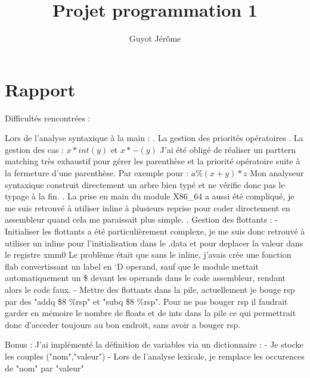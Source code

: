 \documentclass{article}
\title{Projet programmation 1}
\author{Guyot Jérôme}
\begin{document}
\maketitle

\newcommand\tab[1][1cm]{\hspace*{#1}}

\section*{Rapport}

    Difficultés rencontrées :\newline
    
    Lors de l'analyse syntaxique à la main : \newline 
        \tab. La gestion des priorités opératoires \newline
        \tab. La gestion des cas : $x*int(y)$ et $x*-(y)$ \newline
        \tab J'ai été obligé de réaliser un parttern matching très exhaustif pour gérer les parenthèse et la priorité opératoire suite à la fermeture d'une parenthèse. Par exemple pour : $a \% (x + y) * z$       \newline
        \tab Mon analyseur syntaxique construit directement un arbre bien typé et ne vérifie donc pas le typage à la fin. 
        \newline
        \newline
        \tab. La prise en main du module X86\_64 a aussi été compliqué, je me suis retrouvé à utiliser inline à plusieurs reprise pour coder directement en assembleur quand cela me paraissait plus simple. \newline
        \newline
        \tab. Gestion des flottants :\newline
        \tab \tab - Initialiser les flottants a été particulièrement complexe, je me suis donc retrouvé à utiliser un inline pour l'initialisation dans le .data et pour deplacer la valeur dans le registre xmm0
        Le problème était que sans le inline, j'avais crée une fonction flab convertissant un label en `D operand, sauf que le module mettait automatiquement un \$ devant les operands dans le code assembleur, rendant alors le code faux.\newline
        \tab \tab - Mettre des flottants dans la pile, actuellement je bouge rsp par des "addq \$8 \%rsp" et "subq \$8 \%rsp". Pour ne pas bouger rsp il faudrait garder en mémoire le nombre de floats et de ints dans la pile ce qui permettrait donc d'acceder toujours au bon endroit, sans avoir a bouger rsp.\newline

    Bonus : \newline
        \tab J'ai implémenté la définition de variables via un dictionnaire : \newline
        \tab \tab - Je stocke les couples ("nom","valeur") \newline
        \tab \tab - Lors de l'analyse lexicale, je remplace les occurences de "nom" par "valeur" \newline
\end{document}
